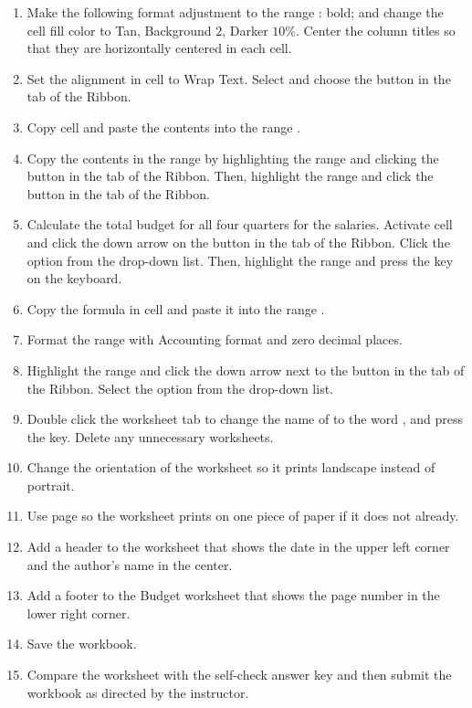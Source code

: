 \begin{enumerate}[resume]
	\item Make the following format adjustment to the range : bold; and change the cell fill color to Tan, Background $ 2 $, Darker $ 10 $\%. Center the column titles so that they are horizontally centered in each cell.
	\item Set the alignment in cell  to Wrap Text. Select  and choose the  button in the  tab of the Ribbon.
	\item Copy cell  and paste the contents into the range .
	\item Copy the contents in the range  by highlighting the range and clicking the  button in the  tab of the Ribbon. Then, highlight the range  and click the  button in the  tab of the Ribbon.
	\item Calculate the total budget for all four quarters for the salaries. Activate cell  and click the down arrow on the  button in the  tab of the Ribbon. Click the  option from the drop-down list. Then, highlight the range  and press the  key on the keyboard.
	\item Copy the formula in cell  and paste it into the range .
	\item Format the range  with Accounting format and zero decimal places.
	\item Highlight the range  and click the down arrow next to the  button in the  tab of the Ribbon. Select the  option from the drop-down list.
	\item Double click the  worksheet tab to change the name of  to the word , and press the  key. Delete any unnecessary worksheets.
	\item Change the orientation of the  worksheet so it prints landscape instead of portrait.
	\item Use  page so the  worksheet prints on one piece of paper if it does not already.
	\item Add a header to the  worksheet that shows the date in the upper left corner and the author's name in the center.
	\item Add a footer to the Budget worksheet that shows the page number in the lower right corner. 
	\item Save the  workbook.
	\item Compare the worksheet with the self-check answer key and then submit the  workbook as directed by the instructor.
\end{enumerate}

